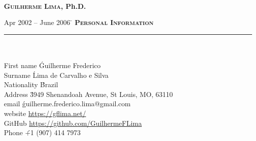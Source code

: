 \documentclass[11pt,a4paper]{article}
\begin{document}
\makeatletter
 \renewcommand{\@evenhead}{\textit{Guilherme Lima CV continued...}\hfil}
 \renewcommand{\@oddhead}{\@evenhead}
 \renewcommand{\@evenfoot}{\hfil \thepage\ of\  \pageref{LastPage}\hfil}
 \renewcommand{\@oddfoot}{\@evenfoot}
\makeatother



\thispagestyle{empty}
\begin{center}
{\huge\textbf{\textsc{\\ Guilherme Lima}, Ph.D.}} \\ \vspace{0.5cm}
\vspace{1.0cm}
\end{center}
\begin{tabbing} 
Apr 2002 -- June 2006 \=\kill
\> \textbf{\Large{\textsc{Personal Information}}}\\
\> \noindent\rule{11cm}{1pt}\\
\\
\> First name \' Guilherme Frederico \\
\> Surname \' Lima de Carvalho e Silva \\
\> Nationality \' Brazil \\
\> Address  \' 3949 Shenandoah Avenue, St Louis, MO, 63110 \\
\> email \' guilherme.frederico.lima@gmail.com \\
\> website \' \href{https://gflima.net/}{\color{blue}https://gflima.net/} \\
\> GitHub \' \href{https://github.com/GuilhermeFLima}{\color{blue}https://github.com/GuilhermeFLima} \\
\> Phone  \' +1 (907) 414 7973 \\
\end{tabbing}



\end{document}
